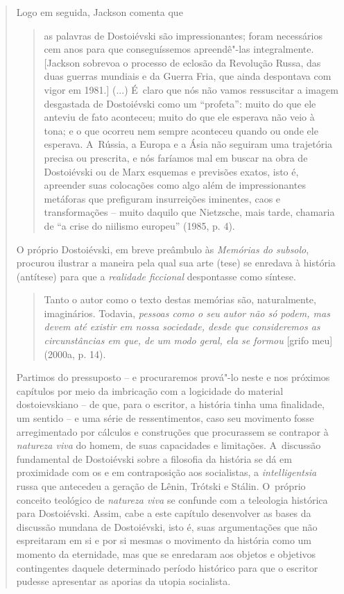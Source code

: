 {\begin{quote}
Logo em seguida, Jackson comenta que

\begin{quote}
as palavras de Dostoiévski são impressionantes; foram necessários cem
anos para que conseguíssemos apreendê"-las integralmente. {[}Jackson
sobrevoa o processo de eclosão da Revolução Russa, das duas guerras
mundiais e da Guerra Fria, que ainda despontava com vigor em 1981.{]}
(...) É~claro que nós não vamos ressuscitar a imagem desgastada de
Dostoiévski como um ``profeta'': muito do que ele anteviu de fato
aconteceu; muito do que ele esperava não veio à tona; e o que ocorreu
nem sempre aconteceu quando ou onde ele esperava. A~Rússia, a Europa e a
Ásia não seguiram uma trajetória precisa ou prescrita, e nós faríamos
mal em buscar na obra de Dostoiévski ou de Marx esquemas e previsões
exatos, isto é, apreender suas colocações como algo além de
impressionantes metáforas que prefiguram insurreições iminentes, caos e
transformações -- muito daquilo que Nietzsche, mais tarde, chamaria de
``a crise do niilismo europeu'' (1985, p. 4).
\end{quote}

O próprio Dostoiévski, em breve preâmbulo às \emph{Memórias do subsolo},
procurou ilustrar a maneira pela qual sua arte (tese) se enredava à
história (antítese) para que a \emph{realidade ficcional} despontasse
como síntese.

\begin{quote}
Tanto o autor como o texto destas memórias são, naturalmente,
imaginários. Todavia, \emph{pessoas como o seu autor não só podem, mas
devem até existir em nossa sociedade, desde que consideremos as
circunstâncias em que, de um modo geral, ela se formou} {[}grifo meu{]}
(2000a, p. 14).
\end{quote}

Partimos do pressuposto -- e procuraremos prová"-lo neste e nos próximos
capítulos por meio da imbricação com a logicidade do material
dostoievskiano -- de que, para o escritor, a história tinha uma
finalidade, um sentido -- e uma série de ressentimentos, caso seu
movimento fosse arregimentado por cálculos e construções que procurassem
se contrapor à \emph{natureza viva} do homem, de suas capacidades e
limitações. A~discussão fundamental de Dostoiévski sobre a filosofia da
história se dá em proximidade com os e em contraposição aos socialistas,
a \emph{intelligentsia} russa que antecedeu a geração de Lênin, Trótski
e Stálin. O~próprio conceito teológico de \emph{natureza viva} se
confunde com a teleologia histórica para Dostoiévski. Assim, cabe a este
capítulo desenvolver as bases da discussão mundana de Dostoiévski, isto
é, suas argumentações que não espreitaram em si e por si mesmas o
movimento da história como um momento da eternidade, mas que se
enredaram aos objetos e objetivos contingentes daquele determinado
período histórico para que o escritor pudesse apresentar as aporias da
utopia socialista.


\end{quote}}
